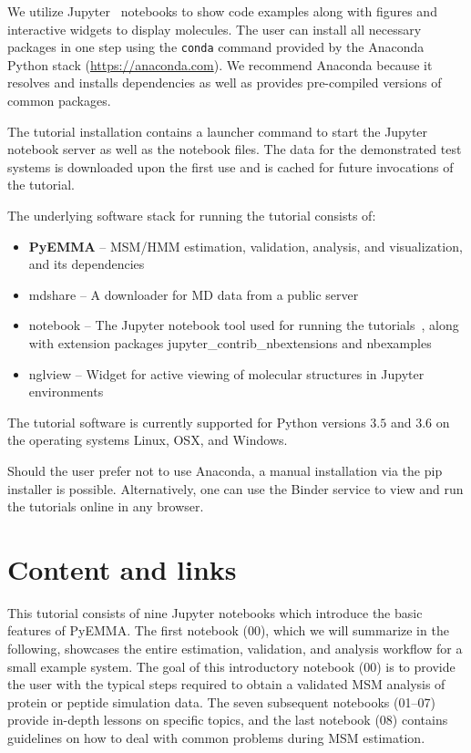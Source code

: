 \documentclass[9pt,tutorial]{livecoms}
\begin{document}
We utilize Jupyter~\cite{jupyter} notebooks to show code examples along with figures and interactive widgets to display molecules.
The user can install all necessary packages in one step using the \texttt{conda} command provided by the Anaconda Python stack (\url{https://anaconda.com}).
We recommend Anaconda because it resolves and installs dependencies as well as provides pre-compiled versions of common packages.

The tutorial installation contains a launcher command to start the Jupyter notebook server as well as the notebook files.
The data for the demonstrated test systems is downloaded upon the first use and is cached for future invocations of the tutorial.

The underlying software stack for running the tutorial consists of:
\begin{itemize}
\item \textbf{PyEMMA} -- MSM/HMM estimation, validation, analysis, and visualization, and its dependencies~\cite{pyemma}
\item mdshare -- A downloader for MD data from a public server
\item notebook -- The Jupyter notebook tool used for running the tutorials~\cite{jupyter}, along with extension packages jupyter\_contrib\_nbextensions and nbexamples
\item nglview -- Widget for active viewing of molecular structures in Jupyter environments~\cite{nglview}
\end{itemize}

The tutorial software is currently supported for Python versions $3.5$ and $3.6$ on the operating systems Linux, OSX, and Windows.

Should the user prefer not to use Anaconda, a manual installation via the pip installer is possible.
Alternatively, one can use the Binder service to view and run the tutorials online in any browser.

\section{Content and links}

This tutorial consists of nine Jupyter notebooks which introduce the basic features of PyEMMA.
The first notebook (00), which we will summarize in the following, showcases the entire estimation, validation, and analysis workflow for a small example system.
The goal of this introductory notebook (00) is to provide the user with the typical steps required to obtain a validated MSM analysis of protein or peptide simulation data.
The seven subsequent notebooks (01--07) provide in-depth lessons on specific topics, and the last notebook (08) contains guidelines on how to deal with common problems during MSM estimation.
\end{document}
